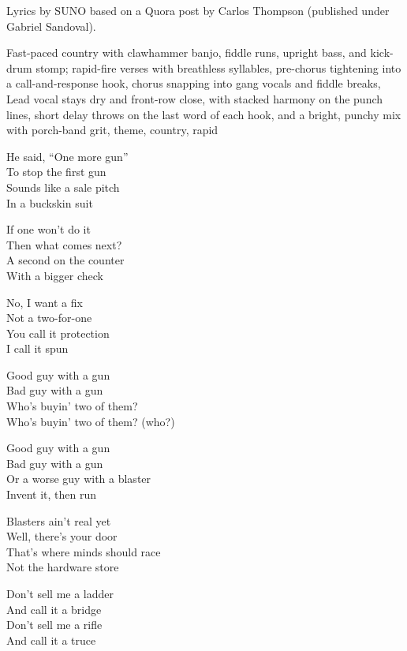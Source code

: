 
\begin{notes}
Lyrics by SUNO based on a Quora post by Carlos Thompson (published under Gabriel Sandoval).
\end{notes}
\begin{style}
Fast-paced country with clawhammer banjo, fiddle runs, upright bass, and kick-drum stomp; rapid-fire verses with breathless syllables, pre-chorus tightening into a call-and-response hook, chorus snapping into gang vocals and fiddle breaks, Lead vocal stays dry and front-row close, with stacked harmony on the punch lines, short delay throws on the last word of each hook, and a bright, punchy mix with porch-band grit, theme, country, rapid
\end{style}
\begin{lyrics}
He said, “One more gun”\\
To stop the first gun\\
Sounds like a sale pitch\\
In a buckskin suit

If one won’t do it\\
Then what comes next?\\
A second on the counter\\
With a bigger check

No, I want a fix\\
Not a two-for-one\\
You call it protection\\
I call it spun

Good guy with a gun\\
Bad guy with a gun\\
Who’s buyin’ two of them?\\
Who’s buyin’ two of them? (who?)

Good guy with a gun\\
Bad guy with a gun\\
Or a worse guy with a blaster\\
Invent it, then run

Blasters ain’t real yet\\
Well, there’s your door\\
That’s where minds should race\\
Not the hardware store

Don’t sell me a ladder\\
And call it a bridge\\
Don’t sell me a rifle\\
And call it a truce


\end{lyrics}
